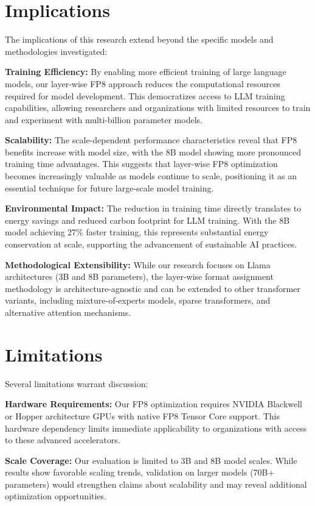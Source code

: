 \section*{Implications}

The implications of this research extend beyond the specific models and methodologies investigated:

\textbf{Training Efficiency:} By enabling more efficient training of large language models, our layer-wise FP8 approach reduces the computational resources required for model development. This democratizes access to LLM training capabilities, allowing researchers and organizations with limited resources to train and experiment with multi-billion parameter models.

\textbf{Scalability:} The scale-dependent performance characteristics reveal that FP8 benefits increase with model size, with the 8B model showing more pronounced training time advantages. This suggests that layer-wise FP8 optimization becomes increasingly valuable as models continue to scale, positioning it as an essential technique for future large-scale model training.

\textbf{Environmental Impact:} The reduction in training time directly translates to energy savings and reduced carbon footprint for LLM training. With the 8B model achieving 27\% faster training, this represents substantial energy conservation at scale, supporting the advancement of sustainable AI practices.

\textbf{Methodological Extensibility:} While our research focuses on Llama architectures (3B and 8B parameters), the layer-wise format assignment methodology is architecture-agnostic and can be extended to other transformer variants, including mixture-of-experts models, sparse transformers, and alternative attention mechanisms.

\section*{Limitations}

Several limitations warrant discussion:

\textbf{Hardware Requirements:} Our FP8 optimization requires NVIDIA Blackwell or Hopper architecture GPUs with native FP8 Tensor Core support. This hardware dependency limits immediate applicability to organizations with access to these advanced accelerators.

\textbf{Scale Coverage:} Our evaluation is limited to 3B and 8B model scales. While results show favorable scaling trends, validation on larger models (70B+ parameters) would strengthen claims about scalability and may reveal additional optimization opportunities.

